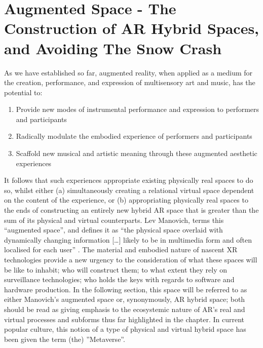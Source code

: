 \section[Augmented Space]{Augmented Space - The Construction of AR Hybrid Spaces, and Avoiding The Snow Crash}\label{sec: theory-space}
As we have established so far, augmented reality, when applied as a medium for the creation, performance, and expression of multisensory art and music, has the potential to:
\begin{enumerate}
    \item Provide new modes of instrumental performance and expression to performers and participants
    \item Radically modulate the embodied experience of performers and participants
    \item Scaffold new musical and artistic meaning through these augmented aesthetic experiences
\end{enumerate}
It follows that such experiences appropriate existing physically real spaces to do so, whilst either (a) simultaneously creating a relational virtual space dependent on the content of the experience, or (b) appropriating physically real spaces to the ends of constructing an entirely new hybrid AR space that is greater than the sum of its physical and virtual counterparts. Lev Manovich, terms this “augmented space”, and defines it as “the physical space overlaid with dynamically changing information […] likely to be in multimedia form and often localised for each user” \citep[p. 2]{manovich2006}. The material and embodied nature of nascent XR technologies provide a new urgency to the consideration of what these spaces will be like to inhabit; who will construct them; to what extent they rely on surveillance technologies; who holds the keys with regards to software and hardware production. In the following section, this space will be referred to as either Manovich’s augmented space or, synonymously, AR hybrid space; both should be read as giving emphasis to the ecosystemic nature of AR’s real and virtual processes and subforms thus far highlighted in the chapter.  In current popular culture, this notion of a type of physical and virtual hybrid space has been given the term (the) ”Metaverse”.

